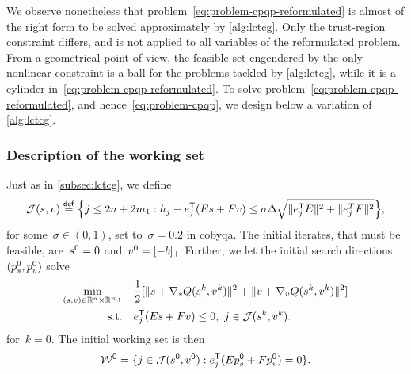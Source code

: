 We observe nonetheless that problem~\cref{eq:problem-cpqp-reformulated} is almost of the right form to be solved approximately by \cref{alg:lctcg}.
Only the trust-region constraint differs, and is not applied to all variables of the reformulated problem.
From a geometrical point of view, the feasible set engendered by the only nonlinear constraint is a ball for the problems tackled by \cref{alg:lctcg}, while it is a cylinder in~\cref{eq:problem-cpqp-reformulated}.
To solve problem~\cref{eq:problem-cpqp-reformulated}, and hence~\cref{eq:problem-cpqp}, we design below a variation of \cref{alg:lctcg}.

\subsubsection{Description of the working set}

Just as in \cref{subsec:lctcg}, we define
\begin{equation*}
    \mathcal{J}(\sstep, v) \eqdef \set[\Big]{j \le 2n + 2m_1 : h_j - e_j^{\T}(E \sstep + F v) \le \sigma \rad \sqrt{\norm{e_j^{\T} E}^2 + \norm{e_j^{T} F}^2}},
\end{equation*}
for some~$\sigma \in (0, 1)$, set to~$\sigma = 0.2$ in \gls{cobyqa}.
The initial iterates, that must be feasible, are~$\sstep[0] = 0$ and~$v^0 = [-b]_+$
Further, we let the initial search directions~$(\pstep[0]_{\sstep}, \pstep[0]_v)$ solve
\begin{subequations}
    \label{eq:cpqp-working-set}
    \begin{align}
        \min_{(\sstep, v) \in \R^n \times \R^{m_1}} & \quad \frac{1}{2} [ \norm{\sstep + \nabla_{\sstep} Q(\sstep[k], v^k)}^2 + \norm{v + \nabla_v Q(\sstep[k], v^k)}^2 ]\\
        \text{s.t.}                                 & \quad e_j^{\T} (E \sstep + F v) \le 0, ~ j \in \mathcal{J}(\sstep[k], v^k).
    \end{align}
\end{subequations}
for~$k = 0$.
The initial working set is then
\begin{equation}
    \label{eq:cpqp-working-set-initial}
    \mathcal{W}^0 = \set{j \in \mathcal{J}(\sstep[0], v^0) : e_j^{\T}(E \pstep[0]_{\sstep} + F \pstep[0]_v) = 0}.
\end{equation}

